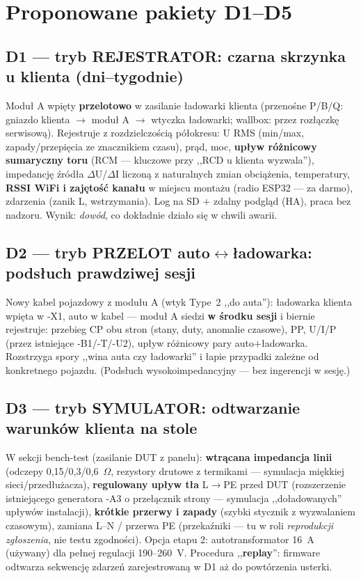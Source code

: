 \documentclass[11pt,a4paper]{article}
\newcommand{\ohm}{$\Omega$}
\begin{document}
\section{Proponowane pakiety D1--D5}
\subsection{D1 --- tryb REJESTRATOR: czarna skrzynka u klienta (dni--tygodnie)}
Moduł A wpięty \textbf{przelotowo} w zasilanie ładowarki klienta (przenośne P/B/Q: gniazdo
klienta $\to$ moduł A $\to$ wtyczka ładowarki; wallbox: przez rozłączkę serwisową). Rejestruje
z rozdzielczością półokresu: U RMS (min/max, zapady/przepięcia ze znacznikiem czasu), prąd, moc,
\textbf{upływ różnicowy sumaryczny toru} (RCM --- kluczowe przy ,,RCD u klienta wyzwala''),
impedancję źródła $\Delta$U/$\Delta$I liczoną z naturalnych zmian obciążenia, temperatury,
\textbf{RSSI WiFi i zajętość kanału} w miejscu montażu (radio ESP32 --- za darmo), zdarzenia
(zanik L, wstrzymania). Log na SD $+$ zdalny podgląd (HA), praca bez nadzoru. Wynik: \emph{dowód},
co dokładnie działo się w chwili awarii.
\subsection{D2 --- tryb PRZELOT auto$\leftrightarrow$ładowarka: podsłuch prawdziwej sesji}
Nowy kabel pojazdowy z modułu A (wtyk Type~2 ,,do auta''): ładowarka klienta wpięta w -X1, auto
w kabel --- moduł A siedzi \textbf{w środku sesji} i biernie rejestruje: przebieg CP obu stron
(stany, duty, anomalie czasowe), PP, U/I/P (przez istniejące -B1/-T/-U2), upływ różnicowy pary
auto$+$ładowarka. Rozstrzyga spory ,,wina auta czy ładowarki'' i łapie przypadki zależne od
konkretnego pojazdu. (Podsłuch wysokoimpedancyjny --- bez ingerencji w sesję.)
\subsection{D3 --- tryb SYMULATOR: odtwarzanie warunków klienta na stole}
W sekcji bench-test (zasilanie DUT z panelu): \textbf{wtrącana impedancja linii} (odczepy
0,15/0,3/0,6~\ohm, rezystory drutowe z termikami --- symulacja miękkiej sieci/przedłużacza),
\textbf{regulowany upływ tła} L$\to$PE przed DUT (rozszerzenie istniejącego generatora -A3
o przełącznik strony --- symulacja ,,doładowanych'' upływów instalacji), \textbf{krótkie przerwy
i zapady} (szybki stycznik z wyzwalaniem czasowym), zamiana L--N / przerwa PE (przekaźniki ---
tu w roli \emph{reprodukcji zgłoszenia}, nie testu zgodności). Opcja etapu 2: autotransformator
16~A (używany) dla pełnej regulacji 190--260~V. Procedura ,,\textbf{replay}'': firmware odtwarza
sekwencję zdarzeń zarejestrowaną w D1 aż do powtórzenia usterki.
\end{document}
